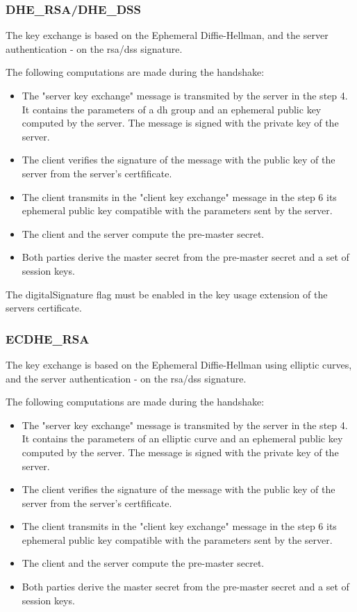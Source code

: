 \subsubsection*{DHE\_RSA/DHE\_DSS}
The key exchange is based on the Ephemeral Diffie-Hellman, and the server authentication - on the \gls{rsa}/\gls{dss} signature.

The following computations are made during the handshake:
\begin{itemize}
	\item The "server key exchange" message is transmited by the server in the step 4. It contains the parameters of a \gls{dh} group and an ephemeral public key computed by the server. The message is signed with the private key of the server.
	\item The client verifies the signature of the message with the public key of the server from the server's certfificate.
	\item The client transmits in the "client key exchange" message in the step 6 its ephemeral public key compatible with the parameters sent by the server.
	\item The client and the server compute the pre-master secret.
	\item Both parties derive the master secret from the pre-master secret and a set of session keys.
\end{itemize}

The digitalSignature flag must be enabled in the key usage extension of the servers certificate.

\subsubsection*{ECDHE\_RSA}
The key exchange is based on the Ephemeral Diffie-Hellman using elliptic curves, and the server authentication - on the \gls{rsa}/\gls{dss} signature.

The following computations are made during the handshake:
\begin{itemize}
	\item The "server key exchange" message is transmited by the server in the step 4. It contains the parameters of an elliptic curve and an ephemeral public key computed by the server. The message is signed with the private key of the server.
	\item The client verifies the signature of the message with the public key of the server from the server's certfificate.
	\item The client transmits in the "client key exchange" message in the step 6 its ephemeral public key compatible with the parameters sent by the server.
	\item The client and the server compute the pre-master secret.
	\item Both parties derive the master secret from the pre-master secret and a set of session keys.
\end{itemize}


